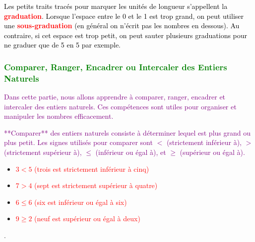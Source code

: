 \documentclass{article}
\begin{document}
\vspace{0.5cm}

\begin{tcolorbox}[colback=cyan!10!white, colframe=lime!75!black, title=\textcolor{black}{Remarque}, sharp corners=southwest]
\textcolor{black}{Les petits traits tracés pour marquer les unités de longueur s'appellent la \textbf{\textcolor{red}{graduation}}. Lorsque l'espace entre le 0 et le 1 est trop grand, on peut utiliser une \textbf{\textcolor{red}{sous-graduation}} (en général on n'écrit pas les nombres en dessous). Au contraire, si cet espace est trop petit, on peut sauter plusieurs graduations pour ne graduer que de 5 en 5 par exemple.}
\end{tcolorbox}

\vspace{0.5cm}

\subsubsection{\textcolor{green}{Comparer, Ranger, Encadrer ou Intercaler des Entiers Naturels}}

\textcolor{purple}{Dans cette partie, nous allons apprendre à comparer, ranger, encadrer et intercaler des entiers naturels. Ces compétences sont utiles pour organiser et manipuler les nombres efficacement.}

\vspace{0.5cm}

\textcolor{purple}{**Comparer** des entiers naturels consiste à déterminer lequel est plus grand ou plus petit. Les signes utilisés pour comparer sont \(<\) (strictement inférieur à), \(>\) (strictement supérieur à), \(\leq\) (inférieur ou égal à), et \(\geq\) (supérieur ou égal à).}

\vspace{0.5cm}

\begin{tcolorbox}[colback=orange!10!white, colframe=orange!75!black, title=\textcolor{white}{Exemples}, sharp corners=southwest]

\begin{itemize}
    \item \textcolor{red}{\(3 < 5\) (trois est strictement inférieur à cinq)}
    \item \textcolor{red}{\(7 > 4\) (sept est strictement supérieur à quatre)}
    \item \textcolor{red}{\(6 \leq 6\) (six est inférieur ou égal à six)}
    \item \textcolor{red}{\(9 \geq 2\) (neuf est supérieur ou égal à deux)}
\end{itemize}.
\end{tcolorbox}
\end{document}
